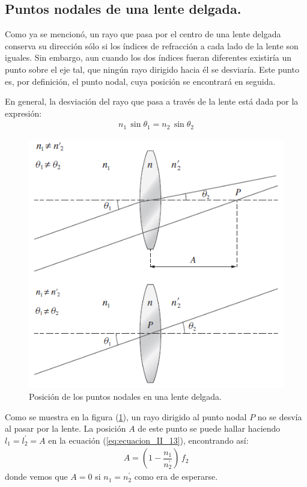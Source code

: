 \documentclass[14pt]{extarticle}
\begin{document}
\subsection{Puntos nodales de una lente delgada.}

Como ya se mencionó, un rayo que pasa por el centro de una lente delgada conserva su dirección sólo si los índices de refracción a cada lado de la lente son iguales. Sin embargo, aun cuando los dos índices fueran diferentes existiría un punto sobre el eje tal, que ningún rayo dirigido hacia él se desviaría. Este punto es, por definición, el punto nodal, cuya posición se encontrará en seguida.

En general, la desviación del rayo que pasa a través de la lente está dada por la expresión:
\begin{align}
n_{1} \, \sin \theta_{1} = n_{2} \, \sin \theta_{2}
\label{eq:ecuacion_II_25}
\end{align}
\begin{figure}[H]
    \centering
    \includegraphics[scale=0.8]{Imagenes/Lentes_10.png}
    \caption{Posición de los puntos nodales en una lente delgada.}
    \label{fig:figura_II_09}
\end{figure}
Como se muestra en la figura (\ref{fig:figura_II_09}), un rayo dirigido al punto nodal $P$ no se desvía al pasar por la lente. La posición $A$ de este punto se puede hallar haciendo $l_{1} = l_{2}^{\prime} = A$ en la ecuación (\ref{eq:ecuacion_II_13}), encontrando así:
\begin{align}
A = \left( 1 - \dfrac{n_{1}}{n_{2}^{\prime}} \right) \, f_{2}
\label{eq:ecuacion_II_26}
\end{align}
donde vemos que $A = 0$ si $n_{1} = n_{2}^{\prime}$ como era de esperarse.
\end{document}

